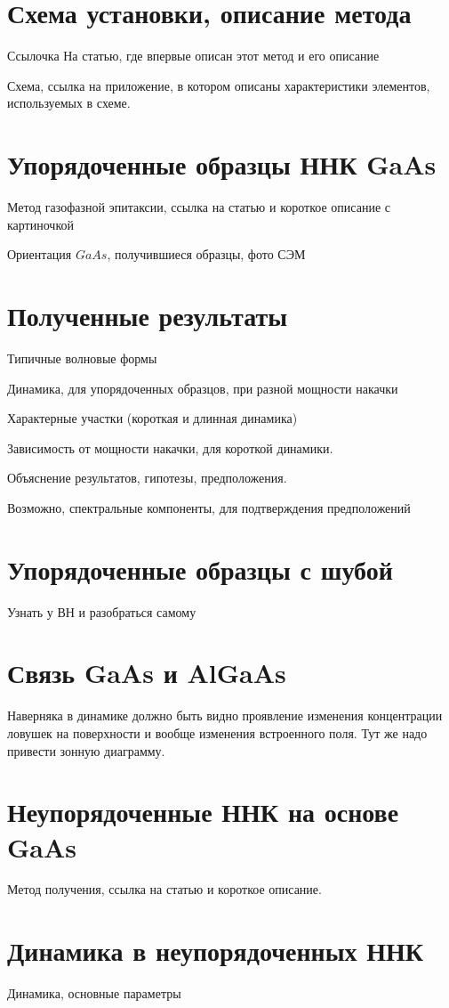 \documentclass[a4paper,14pt,russian]{extreport}
\begin{document}
		\section{Схема установки, описание метода}
			Ссылочка На статью, где впервые описан этот метод и его описание\par	
			Схема, ссылка на приложение, в котором описаны характеристики элементов, используемых в схеме.\par
		\section{Упорядоченные образцы ННК GaAs}
			Метод газофазной эпитаксии, ссылка на статью и короткое описание с картиночкой\par
			Ориентация $GaAs$, получившиеся образцы, фото СЭМ
		\section{Полученные результаты}
			Типичные волновые формы\par
			Динамика, для упорядоченных образцов, при разной мощности накачки\par
			Характерные участки (короткая и длинная динамика) \par
			Зависимость от мощности накачки, для короткой динамики.\par
			Объяснение результатов, гипотезы, предположения.\par
			Возможно, спектральные компоненты, для подтверждения предположений
		\section{Упорядоченные образцы с шубой}
			Узнать у ВН и разобраться самому
		\section{Связь GaAs и AlGaAs}
			Наверняка в динамике должно быть видно проявление изменения концентрации ловушек на поверхности и вообще 					изменения встроенного поля. Тут же надо привести зонную диаграмму.
		\section{Неупорядоченные ННК на основе GaAs}
			Метод получения, ссылка на статью и короткое описание.
		\section{Динамика в неупорядоченных ННК}
			Динамика, основные параметры
\end{document}
